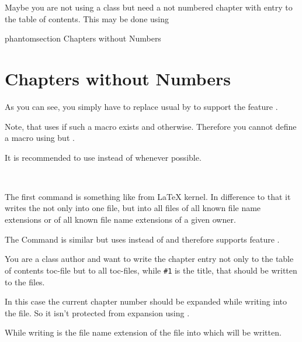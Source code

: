\begin{Example}
  Maybe you are not using a \KOMAScript{} class but need a not numbered
  chapter with entry to the table of contents. This may be done using
\begin{lstcode}
  \cleardoublepage
  \csname phantomsection\endcsname
             {Chapters without Numbers}
  \chapter*{Chapters without Numbers}
\end{lstcode}
  As you can see, you simply have to replace usual  by
   to support the  feature
  .
\end{Example}

Note, that  uses
 if such a macro exists and
 otherwise. Therefore you cannot define
a macro  using
 but .

It is recommended to use  instead of
 whenever possible.%

\begin{Declaration}
  \\
\end{Declaration}
%
%
The first command is something like  from \LaTeX{}
kernel. In difference to that it writes the  not only into
one file, but into all files of all known file name extensions or of all known
file name extensions of a given owner.

The Command  is similar but uses
 instead of  and
therefore supports  feature .
\begin{Example}
  You are a class author and want to write the chapter entry not only to the
  table of contents toc-file but to all toc-files, while \texttt{\#1} is the
  title, that should be written to the files.
  In this case the current chapter number should be expanded while writing
  into the file. So it isn't protected from expansion using .
\end{Example}
While writing 
is the file name extension of the file into which  will be
written.


